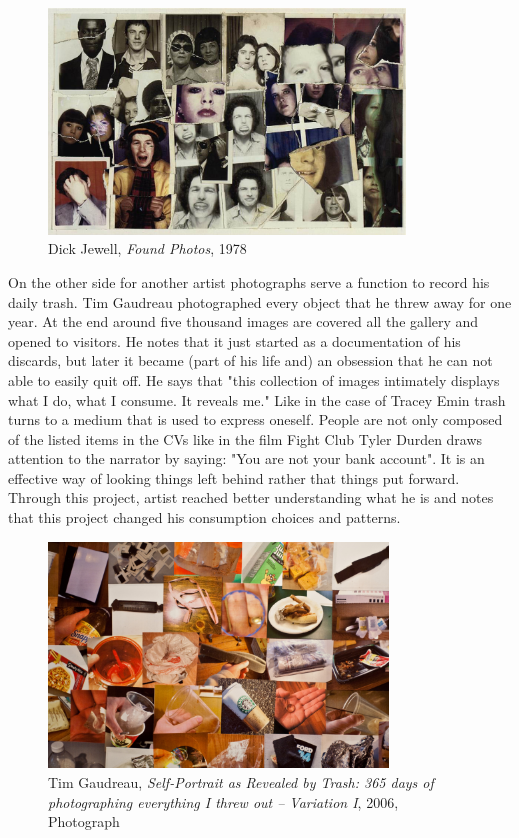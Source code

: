 \begin{figure}[h!]
  \centering
  \includegraphics[height=6cm]{graphics/DickJewell_FoundPhotos.jpg}
  \caption{Dick Jewell, \textit{Found Photos}, 1978}
  \label{fig:DickJewell_FoundPhotos}
\end{figure}

On the other side for another artist photographs serve a function to record his daily trash. Tim Gaudreau photographed every object that he threw away for one year. At the end around five thousand images are covered all the gallery and opened to visitors. He notes that it just started as a documentation of his discards, but later it became (part of his life and) an obsession that he can not able to easily quit off. He says that "this collection of images intimately displays what I do, what I consume. It reveals me." Like in the case of Tracey Emin trash turns to a medium that is used to express oneself. People are not only composed of the listed items in the CVs like in the film Fight Club Tyler Durden draws attention to the narrator by saying: "You are not your bank account". It is an effective way of looking things left behind rather that things put forward. Through this project, artist reached better understanding what he is and notes that this project changed his consumption choices and patterns.

\begin{figure}[h!]
  \centering
  \includegraphics[height=6cm]{graphics/TimGaudreau_SelfPotraitRevealedByTrash.jpg}
  \caption{Tim Gaudreau, \textit{Self-Portrait as Revealed by Trash: 365 days of photographing everything I threw out – Variation I}, 2006, Photograph}
  \label{fig:TimGaudreau_SelfPotraitRevealedByTrash}
\end{figure}

